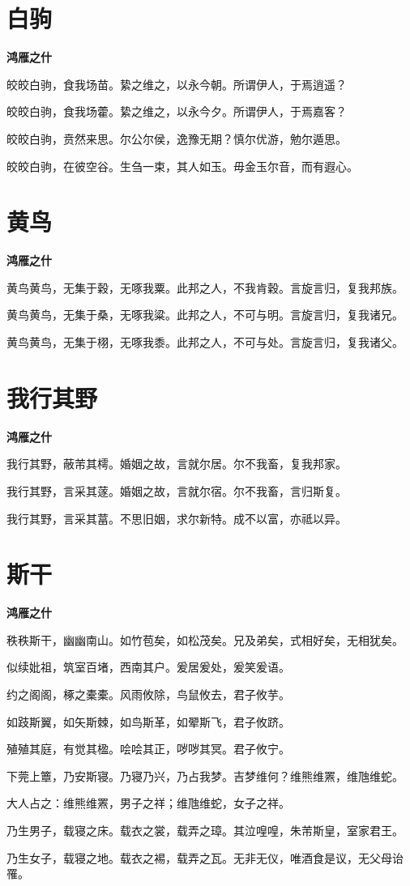 \documentclass[12pt,a4paper]{ctexbook}
\begin{document}
\section{白驹}
\textbf{鸿雁之什}\par\vspace{0.5em}
皎皎白驹，食我场苗。絷之维之，以永今朝。所谓伊人，于焉逍遥？\par
皎皎白驹，食我场藿。絷之维之，以永今夕。所谓伊人，于焉嘉客？\par
皎皎白驹，贲然来思。尔公尔侯，逸豫无期？慎尔优游，勉尔遁思。\par
皎皎白驹，在彼空谷。生刍一束，其人如玉。毋金玉尔音，而有遐心。\par

\section{黄鸟}
\textbf{鸿雁之什}\par\vspace{0.5em}
黄鸟黄鸟，无集于穀，无啄我粟。此邦之人，不我肯穀。言旋言归，复我邦族。\par
黄鸟黄鸟，无集于桑，无啄我粱。此邦之人，不可与明。言旋言归，复我诸兄。\par
黄鸟黄鸟，无集于栩，无啄我黍。此邦之人，不可与处。言旋言归，复我诸父。\par

\section{我行其野}
\textbf{鸿雁之什}\par\vspace{0.5em}
我行其野，蔽芾其樗。婚姻之故，言就尔居。尔不我畜，复我邦家。\par
我行其野，言采其蓫。婚姻之故，言就尔宿。尔不我畜，言归斯复。\par
我行其野，言采其葍。不思旧姻，求尔新特。成不以富，亦祗以异。\par

\section{斯干}
\textbf{鸿雁之什}\par\vspace{0.5em}
秩秩斯干，幽幽南山。如竹苞矣，如松茂矣。兄及弟矣，式相好矣，无相犹矣。\par
似续妣祖，筑室百堵，西南其户。爰居爰处，爰笑爰语。\par
约之阁阁，椓之橐橐。风雨攸除，鸟鼠攸去，君子攸芋。\par
如跂斯翼，如矢斯棘，如鸟斯革，如翚斯飞，君子攸跻。\par
殖殖其庭，有觉其楹。哙哙其正，哕哕其冥。君子攸宁。\par
下莞上簟，乃安斯寝。乃寝乃兴，乃占我梦。吉梦维何？维熊维罴，维虺维蛇。\par
大人占之：维熊维罴，男子之祥；维虺维蛇，女子之祥。\par
乃生男子，载寝之床。载衣之裳，载弄之璋。其泣喤喤，朱芾斯皇，室家君王。\par
乃生女子，载寝之地。载衣之裼，载弄之瓦。无非无仪，唯酒食是议，无父母诒罹。\par
\end{document}
